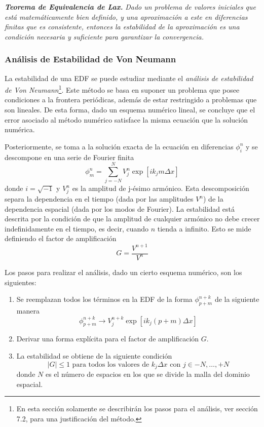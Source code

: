 \documentclass[11pt,twoside,openright,spanish]{report}
\numberwithin{equation}{chapter}
\numberwithin{figure}{chapter}
\numberwithin{table}{chapter}
\begin{document}
\vspace{0.5cm}
\noindent
\textbf{\textit{Teorema de Equivalencia de Lax.}}	\textit{Dado un problema de valores iniciales que está matemáticamente bien definido, y una aproximación a este en diferencias finitas que es consistente, entonces la estabilidad de la aproximación es una condición necesaria y suficiente para garantizar la convergencia.}

\subsubsection{Análisis de Estabilidad de Von Neumann}
\noindent 
La estabilidad de una EDF se puede estudiar mediante el \textit{análisis de estabilidad de Von Neumann}\footnote{En esta sección solamente se describirán los pasos para el análisis, ver \citet{Hirsch2007} sección 7.2, para una justificación del método.}. Este método se basa en suponer un problema que posee condiciones a la frontera periódicas, además de estar restringido a problemas que son lineales. De esta forma, dado un esquema numérico lineal, se concluye que el error asociado al método numérico satisface la misma ecuación que la solución numérica. 

Posteriormente, se toma a la solución exacta de la ecuación en diferencias $\phi_i^n$ y se descompone en una serie de Fourier finita 
\begin{equation}
\phi_m^n=\sum_{j=-N}^{N}V_j^n\exp\left[i k_jm\Delta x\right]
\end{equation}
donde $i=\sqrt{-1}$ y $V_j^n$ es la amplitud de j-ésimo armónico. Esta descomposición separa la dependencia en el tiempo (dada por las amplitudes $V^n$) de la dependencia espacial (dada por los modos de Fourier). La estabilidad está descrita por la condición de que la amplitud de cualquier armónico no debe crecer indefinidamente en el tiempo, es decir, cuando $n$ tienda a infinito. Esto se mide definiendo el factor de amplificación 
\begin{equation}
G=\frac{V^{n+1}}{V^n}
\end{equation}

Los pasos para realizar el análisis, dado un cierto esquema numérico, son los siguientes:

\begin{enumerate}
	\item Se reemplazan todos los términos en la EDF de la forma $\phi^{n+k}_{p+m}$ de la siguiente manera
	\begin{equation}
	\phi^{n+k}_{p+m}\rightarrow V^{n+k}_j\exp\left[ik_j(p+m)\Delta x\right]
	\end{equation}
	\item Derivar una forma explícita para el factor de amplificación $G$.
	\item La estabilidad se obtiene de la siguiente condición
	\begin{equation}
	|G|\leq 1 \text{ para todos los valores de $k_j\Delta x$ con $j\in{-N,\dots,+N}$}
	\end{equation}
	donde $N$ es el número de espacios en los que se divide la malla del dominio espacial.
\end{enumerate}
\end{document}
